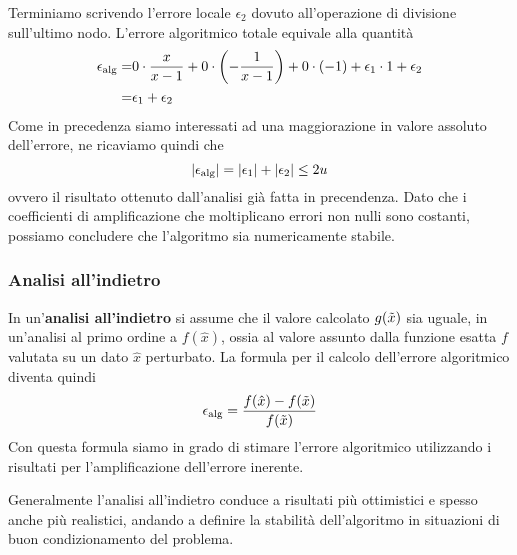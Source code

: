 \begin{example}
	Terminiamo scrivendo l'errore locale $\epsilon_2$ dovuto all'operazione di divisione sull'ultimo nodo. L'errore
	algoritmico totale equivale alla quantità
	\begin{align*}
		\epsilon_\text{alg} = & 0 \cdot \frac{x}{x-1} + 0 \cdot \left( -\frac{1}{x-1} \right) + 0 \cdot (-1) +
		\epsilon_1 \cdot 1 + \epsilon_2                                                          \\
		=       & \epsilon_1 + \epsilon_2
	\end{align*}
	Come in precedenza siamo interessati ad una maggiorazione in valore assoluto dell'errore, ne ricaviamo quindi
	che
	\[ |\epsilon_\text{alg}| = |\epsilon_1| + |\epsilon_2| \leq 2u \]
	ovvero il risultato ottenuto dall'analisi già fatta in precendenza. Dato che i coefficienti di amplificazione
	che moltiplicano errori non nulli sono costanti, possiamo concludere che l'algoritmo sia numericamente stabile.
\end{example}

\subsubsection{Analisi all'indietro}
In un'\textbf{analisi all'indietro} si assume che il valore calcolato $g(\tilde{x})$ sia uguale, in un'analisi al primo
ordine a $f(\hat{x})$, ossia al valore assunto dalla funzione esatta $f$ valutata su un dato $\hat{x}$ perturbato.
La formula per il calcolo dell'errore algoritmico diventa quindi
\[ \epsilon_\text{alg} = \frac{f(\hat{x}) - f(\tilde{x})}{f(\tilde{x})} \]
Con questa formula siamo in grado di stimare l'errore algoritmico utilizzando i risultati per l'amplificazione
dell'errore inerente.

Generalmente l'analisi all'indietro conduce a risultati più ottimistici e spesso anche più realistici, andando a
definire la stabilità dell'algoritmo in situazioni di buon condizionamento del problema.
